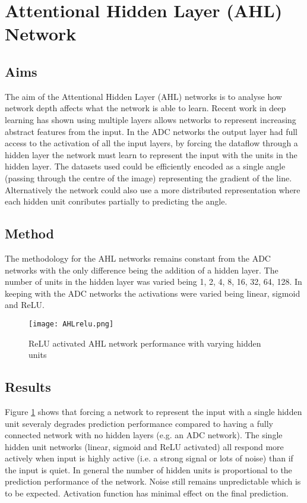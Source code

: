 \section{Attentional Hidden Layer (AHL) Network}

\subsection{Aims}
The aim of the Attentional Hidden Layer (AHL) networks is to analyse how network depth affects what the network is able to learn. 
Recent work in deep learning\cite{krizhevsky2012imagenet} has shown using multiple layers allows networks to represent increasing abstract features from the input. 
In the ADC networks the output layer had full access to the activation of all the input layers, by forcing the dataflow through a hidden layer the network must learn to represent the input with the units in the hidden layer.  
The datasets used could be efficiently encoded as a single angle (passing through the centre of the image) representing the gradient of the line.
Alternatively the network could also use a more distributed representation where each hidden unit conributes partially to predicting the angle. 


\subsection{Method}
The methodology for the AHL networks remains constant from the ADC networks with the only difference being the addition of a hidden layer.
The number of units in the hidden layer was varied being 1, 2, 4, 8, 16, 32, 64, 128.
In keeping with the ADC networks the activations were varied being linear, sigmoid and ReLU. 


\begin{figure}[h]
    \centering
    \texttt{[image: AHLrelu.png]}
    \caption{ReLU activated AHL network performance with varying hidden units}
    \label{fig:AHLrelu}
\end{figure}

\subsection{Results}
Figure \ref{fig:AHLrelu} shows that forcing a network to represent the input with a single hidden unit severaly degrades prediction performance compared to having a fully connected network with no hidden layers (e.g. an ADC network). 
The single hidden unit networks (linear, sigmoid and ReLU activated) all respond more actively when input is highly active (i.e. a strong signal or lots of noise) than if the input is quiet. 
In general the number of hidden units is proportional to the prediction performance of the network.
Noise still remains unpredictable which is to be expected. 
Activation function has minimal effect on the final prediction. 


